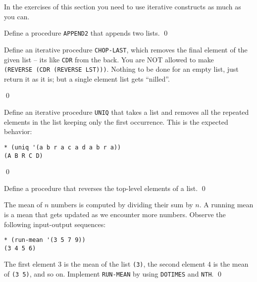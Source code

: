 \documentclass[a4paper,11pt]{article}
\begin{document}
\begin{uenum}

\end{uenum}

\noindent\hrulefill

\noindent In the exercises of this section you need to use iterative constructs as much as you can.

\begin{uexercise}
Define a procedure \Verb+APPEND2+ that appends two lists. 
\qed
\end{uexercise}

\begin{uexercise}
Define an iterative procedure \Verb+CHOP-LAST+, which removes the final element of the given list -- its like \Verb+CDR+ from the back. You are NOT allowed to make\\ \Verb+(REVERSE (CDR (REVERSE LST)))+. Nothing to be done for an empty list, just return it as it is; but a single element list gets ``nilled''.

\qed
\end{uexercise}

\begin{uexercise}
Define an iterative procedure \Verb+UNIQ+ that takes a list and removes all the repeated elements in the list keeping only the first occurrence. This is the expected behavior:

\begin{Verbatim}
* (uniq '(a b r a c a d a b r a))
(A B R C D)
\end{Verbatim}
\qed
\end{uexercise}

\begin{uexercise}
Define a procedure that reverses the top-level elements of a list.
\qed
\end{uexercise}

\begin{uexercise}
The mean of $n$ numbers is computed by dividing their sum by $n$. A running mean is a mean that gets updated as we encounter more numbers. Observe the following input-output sequences:

\begin{Verbatim}
* (run-mean '(3 5 7 9))
(3 4 5 6)
\end{Verbatim}

The first element 3 is the mean of the list \Verb+(3)+, the second element 4 is the mean of \Verb+(3 5)+, and so on. Implement \Verb+RUN-MEAN+ by using \Verb+DOTIMES+ and \Verb+NTH+.
\qed
\end{uexercise}
\end{document}
